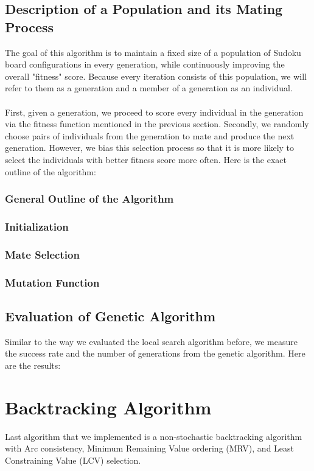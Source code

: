 \documentclass[12pt, a4paper]{article}
\begin{document}
		\subsection{Description of a Population and its Mating Process}
			The goal of this algorithm is to maintain a fixed size of a population of Sudoku board configurations in every generation, while continuously improving the overall "fitness" score. Because every iteration consists of this population, we will refer to them as a generation and a member of a generation as an individual.\\\\
			First, given a generation, we proceed to score every individual in the generation via the fitness function mentioned in the previous section. Secondly, we randomly choose pairs of individuals from the generation to mate and produce the next generation. However, we bias this selection process so that it is more likely to select the individuals with better fitness score more often. Here is the exact outline of the algorithm:
			\subsubsection{General Outline of the Algorithm}
			\subsubsection{Initialization}
			\subsubsection{Mate Selection}
			\subsubsection{Mutation Function}
		\subsection{Evaluation of Genetic Algorithm}
			Similar to the way we evaluated the local search algorithm before, we measure the success rate and the number of generations from the genetic algorithm. Here are the results:
	\section{Backtracking Algorithm}
		Last algorithm that we implemented is a non-stochastic backtracking algorithm with Arc consistency, Minimum Remaining Value ordering (MRV), and Least Constraining Value (LCV) selection.
\end{document}
